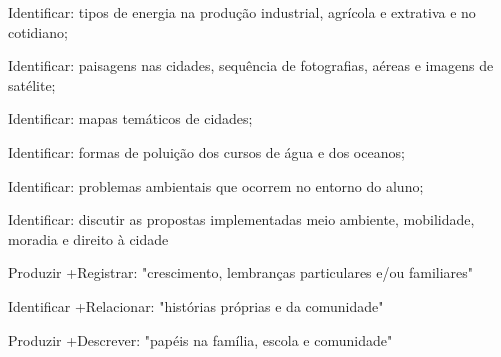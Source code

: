  Identificar: tipos de energia na produção industrial, agrícola e extrativa e no cotidiano;

 Identificar: paisagens nas cidades, sequência de fotografias, aéreas e imagens de satélite;

 Identificar: mapas temáticos de cidades;

 Identificar: formas de poluição dos cursos de água e dos oceanos;

 Identificar: problemas ambientais que ocorrem no entorno do aluno;

 Identificar: discutir as propostas implementadas meio ambiente, mobilidade, moradia e direito à cidade

 Produzir +Registrar: "crescimento, lembranças particulares e/ou familiares"

 Identificar +Relacionar: "histórias próprias e da comunidade"

 Produzir +Descrever: "papéis na família, escola e comunidade"

